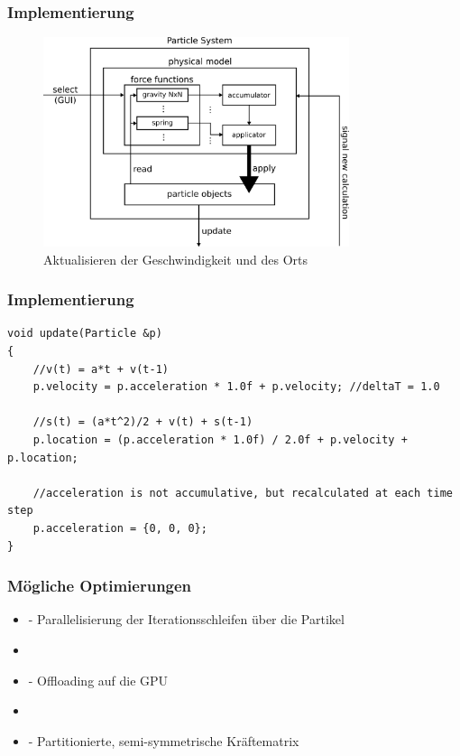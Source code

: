 \documentclass{beamer}
\begin{document}
\begin{frame}
\frametitle{Implementierung}
\begin{figure}[]
\centering
\includegraphics[width=0.8\textwidth]{images/detail3.pdf}
\caption{Aktualisieren der Geschwindigkeit und des Orts}
\end{figure}
\end{frame}


\begin{frame}[fragile]
\frametitle{Implementierung}
\begin{lstlisting}[caption=Update Funktion]
void update(Particle &p)
{
	//v(t) = a*t + v(t-1)                                                            
	p.velocity = p.acceleration * 1.0f + p.velocity; //deltaT = 1.0                                  
                                                                                           
	//s(t) = (a*t^2)/2 + v(t) + s(t-1)                                               
	p.location = (p.acceleration * 1.0f) / 2.0f + p.velocity + p.location;
                                       	
	//acceleration is not accumulative, but recalculated at each time step          
	p.acceleration = {0, 0, 0};
}                                                            
\end{lstlisting}
\end{frame}

\begin{frame}
\frametitle{M\"ogliche Optimierungen}
\begin{itemize}[label={}]
 \item<1->- Parallelisierung der Iterationsschleifen \"uber die Partikel
 \item
 \item<2->- Offloading auf die GPU
 \item
 \item<3->- Partitionierte, semi-symmetrische Kr\"aftematrix
\end{itemize}
\end{frame}
\end{document}
